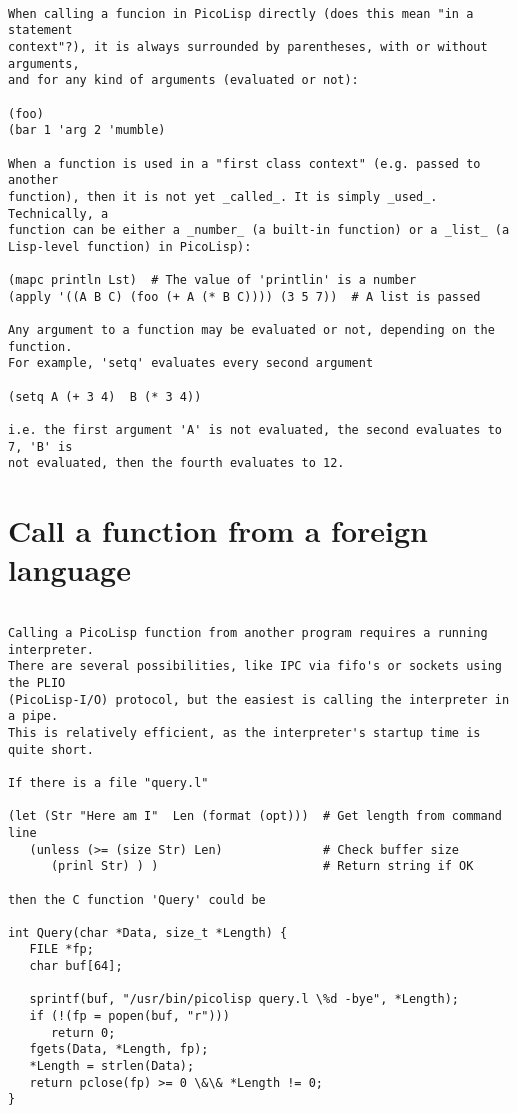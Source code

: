\begin{verbatim}

When calling a funcion in PicoLisp directly (does this mean "in a statement
context"?), it is always surrounded by parentheses, with or without arguments,
and for any kind of arguments (evaluated or not):

(foo)
(bar 1 'arg 2 'mumble)

When a function is used in a "first class context" (e.g. passed to another
function), then it is not yet _called_. It is simply _used_. Technically, a
function can be either a _number_ (a built-in function) or a _list_ (a
Lisp-level function) in PicoLisp):

(mapc println Lst)  # The value of 'printlin' is a number
(apply '((A B C) (foo (+ A (* B C)))) (3 5 7))  # A list is passed

Any argument to a function may be evaluated or not, depending on the function.
For example, 'setq' evaluates every second argument

(setq A (+ 3 4)  B (* 3 4))

i.e. the first argument 'A' is not evaluated, the second evaluates to 7, 'B' is
not evaluated, then the fourth evaluates to 12.

\end{verbatim}

\section*{Call a function from a foreign language}

\begin{verbatim}

Calling a PicoLisp function from another program requires a running interpreter.
There are several possibilities, like IPC via fifo's or sockets using the PLIO
(PicoLisp-I/O) protocol, but the easiest is calling the interpreter in a pipe.
This is relatively efficient, as the interpreter's startup time is quite short.

If there is a file "query.l"

(let (Str "Here am I"  Len (format (opt)))  # Get length from command line
   (unless (>= (size Str) Len)              # Check buffer size
      (prinl Str) ) )                       # Return string if OK

then the C function 'Query' could be

int Query(char *Data, size_t *Length) {
   FILE *fp;
   char buf[64];

   sprintf(buf, "/usr/bin/picolisp query.l \%d -bye", *Length);
   if (!(fp = popen(buf, "r")))
      return 0;
   fgets(Data, *Length, fp);
   *Length = strlen(Data);
   return pclose(fp) >= 0 \&\& *Length != 0;
}

\end{verbatim}

